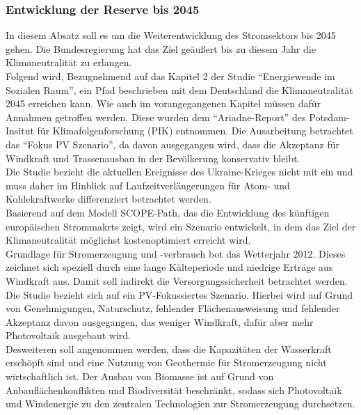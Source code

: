 		\subsubsection{Entwicklung der Reserve bis 2045}
		In diesem Absatz soll es um die Weiterentwicklung des Stromsektors bis 2045 gehen. Die Bundesregierung hat das Ziel geäußert bis zu diesem Jahr die Klimaneutralität zu erlangen.\\
		Folgend wird, Bezugnehmend auf das Kapitel 2 der Studie "`Energiewende im Sozialen Raum"', ein Pfad beschrieben mit dem Deutschland die Klimaneutralität 2045 erreichen kann. Wie auch im vorangegangenen Kapitel müssen dafür Annahmen getroffen werden. Diese wurden dem "`Ariadne-Report"' des Potsdam-Insitut für Klimafolgenforschung (PIK) entnommen.\cite[S.150]{AriadneReport} Die Ausarbeitung betrachtet das "`Fokus PV Szenario"', da davon ausgegangen wird, dass die Akzeptanz für Windkraft und Trassenausbau in der Bevölkerung konservativ bleibt.\\
		Die Studie bezieht die aktuellen Ereignisse des Ukraine-Krieges nicht mit ein und muss daher im Hinblick auf Laufzeitverlängerungen für Atom- und Kohlekraftwerke differenziert betrachtet werden.\\
		
		Basierend auf dem Modell SCOPE-Path, das die Entwicklung des künftigen europäischen Strommakrts zeigt, wird ein Szenario entwickelt, in dem das Ziel der Klimaneutralität möglichst kostenoptimiert erreicht wird.\\
		Grundlage für Stromerzeugung und -verbrauch bot das Wetterjahr 2012. Dieses zeichnet sich speziell durch eine lange Kälteperiode und niedrige Erträge aus Windkraft aus. Damit soll indirekt die Versorgungssicherheit betrachtet werden.\cite{ESRa_Fraunhofer}\\
		
		Die Studie bezieht sich auf ein PV-Fokussiertes Szenario. Hierbei wird auf Grund von Genehmigungen, Naturschutz, fehlender Flächenausweisung und fehlender Akzeptanz davon ausgegangen, das weniger Windkraft, dafür aber mehr Photovoltaik ausgebaut wird.\\
		Desweiteren soll angenommen werden, dass die Kapazitäten der Wasserkraft erschöpft sind und eine Nutzung von Geothermie für Stromerzeugung nicht wirtschaftlich ist. Der Ausbau von Biomasse ist auf Grund von Anbauflächenkonflikten und Biodiversität beschränkt, sodass sich Photovoltaik und Windenergie zu den zentralen Technologien zur Stromerzeugung durchsetzen.\cite{ESRa_Fraunhofer}\\
		
